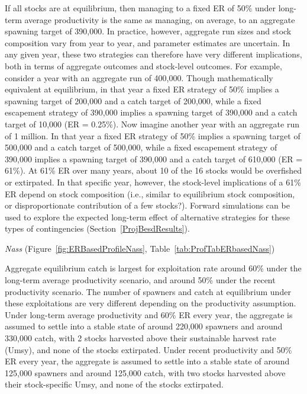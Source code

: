 \documentclass[french,11pt]{book}
\begin{document}
If all stocks are at equilibrium, then managing to a fixed ER of 50\% under long-term average productivity is the same as managing, on average, to an aggregate spawning target of 390,000. In practice, however, aggregate run sizes and stock composition vary from year to year, and parameter estimates are uncertain. In any given year, these two strategies can therefore have very different implications, both in terms of aggregate outcomes and stock-level outcomes. For example, consider a year with an aggregate run of 400,000. Though mathematically equivalent at equilibrium, in that year a fixed ER strategy of 50\% implies a spawning target of 200,000 and a catch target of 200,000, while a fixed escapement strategy of 390,000 implies a spawning target of 390,000 and a catch target of 10,000 (ER = 0.25\%). Now imagine another year with an aggregate run of 1 million. In that year a fixed ER strategy of 50\% implies a spawning target of 500,000 and a catch target of 500,000, while a fixed escapement strategy of 390,000 implies a spawning target of 390,000 and a catch target of 610,000 (ER = 61\%). At 61\% ER over many years, about 10 of the 16 stocks would be overfished or extirpated. In that specific year, however, the stock-level implications of a 61\% ER depend on stock composition (i.e., similar to equilibrium stock composition, or disproportionate contribution of a few stocks?). Forward simulations can be used to explore the expected long-term effect of alternative strategies for these types of contingencies (Section~\ref{ProjBesdResults}).

\emph{Nass} (Figure~\ref{fig:ERBasedProfileNass}, Table~\ref{tab:ProfTabERbasedNass})

Aggregate equilibrium catch is largest for exploitation rate around 60\% under the long-term average productivity scenario, and around 50\% under the recent productivity scenario. The number of spawners and catch at equilibrium under these exploitations are very different depending on the productivity assumption. Under long-term average productivity and 60\% ER every year, the aggregate is assumed to settle into a stable state of around 220,000 spawners and around 330,000 catch, with 2 stocks harvested above their sustainable harvest rate (Umsy), and none of the stocks extirpated. Under recent productivity and 50\% ER every year, the aggregate is assumed to settle into a stable state of around 125,000 spawners and around 125,000 catch, with two stocks harvested above their stock-specific Umsy, and none of the stocks extirpated.
\end{document}
